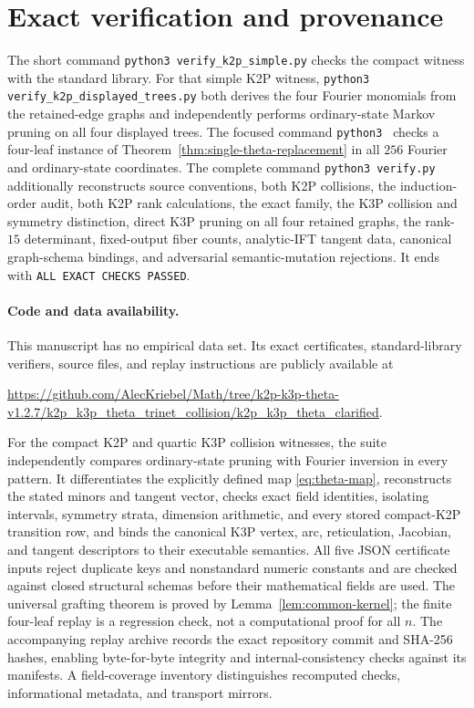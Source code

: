 \documentclass[11pt]{article}
\theoremstyle{remark}\newtheorem{remark}[theorem]{Remark}
\begin{document}
\section{Exact verification and provenance}
The short command \texttt{python3 verify\_k2p\_simple.py} checks the compact witness with the standard library. For that simple K2P witness, \texttt{python3 verify\_k2p\_displayed\_trees.py} both derives the four Fourier monomials from the retained-edge graphs and independently performs ordinary-state Markov pruning on all four displayed trees. The focused command \texttt{python3 } checks a four-leaf instance of Theorem~\ref{thm:single-theta-replacement} in all $256$ Fourier and ordinary-state coordinates. The complete command \texttt{python3 verify.py} additionally reconstructs source conventions, both K2P collisions, the induction-order audit, both K2P rank calculations, the exact family, the K3P collision and symmetry distinction, direct K3P pruning on all four retained graphs, the rank-$15$ determinant, fixed-output fiber counts, analytic-IFT tangent data, canonical graph-schema bindings, and adversarial semantic-mutation rejections. It ends with \texttt{ALL EXACT CHECKS PASSED}.

\paragraph{Code and data availability.}
This manuscript has no empirical data set. Its exact certificates, standard-library verifiers, source files, and replay instructions are publicly available at
\begin{center}
\url{https://github.com/AlecKriebel/Math/tree/k2p-k3p-theta-v1.2.7/k2p_k3p_theta_trinet_collision/k2p_k3p_theta_clarified}.
\end{center}
For the compact K2P and quartic K3P collision witnesses, the suite independently compares ordinary-state pruning with Fourier inversion in every pattern. It differentiates the explicitly defined map \eqref{eq:theta-map}, reconstructs the stated minors and tangent vector, checks exact field identities, isolating intervals, symmetry strata, dimension arithmetic, and every stored compact-K2P transition row, and binds the canonical K3P vertex, arc, reticulation, Jacobian, and tangent descriptors to their executable semantics. All five JSON certificate inputs reject duplicate keys and nonstandard numeric constants and are checked against closed structural schemas before their mathematical fields are used. The universal grafting theorem is proved by Lemma~\ref{lem:common-kernel}; the finite four-leaf replay is a regression check, not a computational proof for all $n$. The accompanying replay archive records the exact repository commit and SHA-256 hashes, enabling byte-for-byte integrity and internal-consistency checks against its manifests. A field-coverage inventory distinguishes recomputed checks, informational metadata, and transport mirrors.
\end{document}
